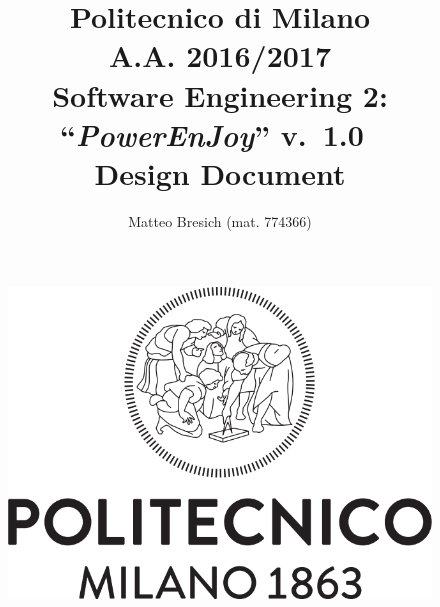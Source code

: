 \documentclass{article}
\newcommand{\version}{\mbox{\normalfont v. 1.0 }}
\begin{document}
	\title{Politecnico di Milano\\A.A. 2016/2017\\Software Engineering 2: ``{\em PowerEnJoy}'' \version \\ \bigskip \textbf{D}esign \textbf{D}ocument}
	\author{Matteo Bresich (mat. 774366)}
	
	
	
	\begin{figure}[t]
		\centering
		\includegraphics[width=\linewidth]{"img/logo-polimi"}
		\label{fig:polimi-logo}
	\end{figure}

	\maketitle
	
	\thispagestyle{empty}
	\clearpage\mbox{}\thispagestyle{empty}\clearpage
	
	\renewcommand*\thesection{\arabic{section}}
	\renewcommand*\thesubsection{\arabic{section}.\arabic{subsection}}
	\renewcommand*\thesubsubsection{%
		\arabic{section}.\arabic{subsection}.\arabic{subsubsection}%
	}
	\setcounter{secnumdepth}{4}
	\setcounter{tocdepth}{4}
	
	\renewcommand{\contentsname}{Table of Content}
	\tableofcontents
	
\end{document}
